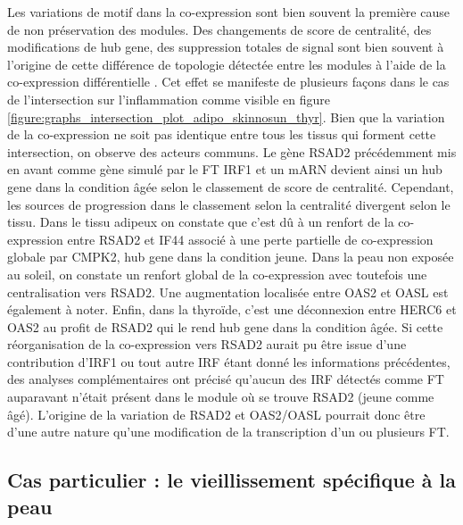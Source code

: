 Les variations de motif dans la co-expression sont bien souvent la première cause de non préservation des modules. Des changements de score de centralité, des modifications de hub gene, des suppression totales de signal sont bien souvent à l'origine de cette différence de topologie détectée entre les modules à l'aide de la co-expression différentielle \cite{Ritchie2016,Zhang2005a}. Cet effet se manifeste de plusieurs façons dans le cas de l'intersection sur l'inflammation comme visible en figure \ref{figure:graphs_intersection_plot_adipo_skinnosun_thyr}. Bien que la variation de la co-expression ne soit pas identique entre tous les tissus qui forment cette intersection, on observe des acteurs communs. Le gène RSAD2 précédemment mis en avant comme gène simulé par le FT IRF1 et un mARN devient ainsi un hub gene dans la condition âgée selon le classement de score de centralité. Cependant, les sources de progression dans le classement selon la centralité divergent selon le tissu. Dans le tissu adipeux on constate que c'est dû à un renfort de la co-expression entre RSAD2 et IF44 associé à une perte partielle de co-expression globale par CMPK2, hub gene dans la condition jeune. Dans la peau non exposée au soleil, on constate un renfort global de la co-expression avec toutefois une centralisation vers RSAD2. Une augmentation localisée entre OAS2 et OASL est également à noter. Enfin, dans la thyroïde, c'est une déconnexion entre HERC6 et OAS2 au profit de RSAD2 qui le rend hub gene dans la condition âgée. Si cette réorganisation de la co-expression vers RSAD2 aurait pu être issue d'une contribution d'IRF1 ou tout autre IRF étant donné les informations précédentes, des analyses complémentaires ont précisé qu'aucun des IRF détectés comme FT auparavant n'était présent dans le module où se trouve RSAD2 (jeune comme âgé). L'origine de la variation de RSAD2 et OAS2/OASL pourrait donc être d'une autre nature qu'une modification de la transcription d'un ou plusieurs FT.


\subsection{Cas particulier : le vieillissement spécifique à la peau}

